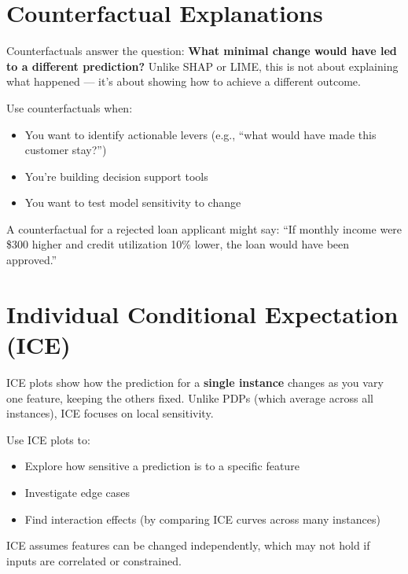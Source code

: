 \documentclass[12pt,openany, draft]{book}
\begin{document}
\section{Counterfactual Explanations}

Counterfactuals answer the question: \textbf{What minimal change would have led to a different prediction?} Unlike SHAP or LIME, this is not about explaining what happened — it’s about showing how to achieve a different outcome.

Use counterfactuals when:
\begin{itemize}
  \item You want to identify actionable levers (e.g., ``what would have made this customer stay?'')
  \item You're building decision support tools
  \item You want to test model sensitivity to change
\end{itemize}

\begin{examplebox}
A counterfactual for a rejected loan applicant might say: ``If monthly income were \$300 higher and credit utilization 10\% lower, the loan would have been approved.''
\end{examplebox}



\section{Individual Conditional Expectation (ICE)}

ICE plots show how the prediction for a \textbf{single instance} changes as you vary one feature, keeping the others fixed. Unlike PDPs (which average across all instances), ICE focuses on local sensitivity.

Use ICE plots to:
\begin{itemize}
  \item Explore how sensitive a prediction is to a specific feature
  \item Investigate edge cases
  \item Find interaction effects (by comparing ICE curves across many instances)
\end{itemize}

\noindent\begin{minipage}{\textwidth}
\begin{notebox}
ICE assumes features can be changed independently, which may not hold if inputs are correlated or constrained.
\end{notebox}
\end{minipage}
\end{document}

